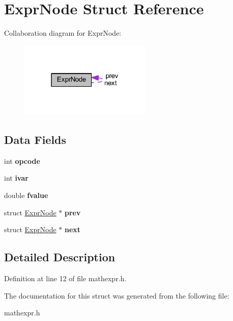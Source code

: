 \hypertarget{struct_expr_node}{}\section{Expr\+Node Struct Reference}
\label{struct_expr_node}


Collaboration diagram for Expr\+Node\+:
\nopagebreak
\begin{figure}[H]
\begin{center}
\leavevmode
\includegraphics[width=178pt]{de/d7d/struct_expr_node__coll__graph}
\end{center}
\end{figure}
\subsection*{Data Fields}
\begin{DoxyCompactItemize}
\item 
\mbox{\label{struct_expr_node_aff3af4fae5174de7c7e40ec004999ca0}} 
int {\bfseries opcode}
\item 
\mbox{\label{struct_expr_node_adc87312468a7b326c477331e96e12a7a}} 
int {\bfseries ivar}
\item 
\mbox{\label{struct_expr_node_a40dfd136bc3109757a5dcc034cab2006}} 
double {\bfseries fvalue}
\item 
\mbox{\label{struct_expr_node_ac35af233fae5a5c6855f9a8c7bd85a9a}} 
struct \hyperlink{struct_expr_node}{Expr\+Node} $\ast$ {\bfseries prev}
\item 
\mbox{\label{struct_expr_node_a12fc1960ea481db7624e2c6c9f8b2329}} 
struct \hyperlink{struct_expr_node}{Expr\+Node} $\ast$ {\bfseries next}
\end{DoxyCompactItemize}


\subsection{Detailed Description}


Definition at line 12 of file mathexpr.\+h.



The documentation for this struct was generated from the following file\+:\begin{DoxyCompactItemize}
\item 
mathexpr.\+h\end{DoxyCompactItemize}

